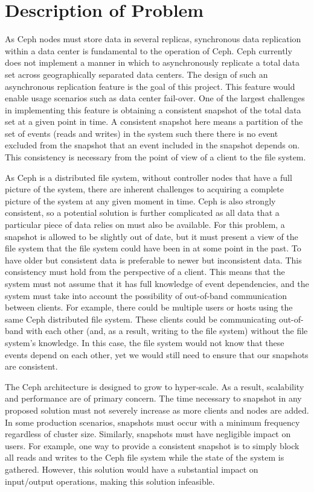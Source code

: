 \chapter{Description of Problem}
\label{sec:description}

As Ceph nodes must store data in several replicas, synchronous data
replication within a data center is fundamental to the operation of
Ceph. Ceph currently does not implement a manner in which to
asynchronously replicate a total data set across geographically
separated data centers. The design of such an asynchronous replication
feature is the goal of this project.  This feature would enable usage
scenarios such as data center fail-over. One of the largest challenges
in implementing this feature is obtaining a consistent snapshot of the
total data set at a given point in time. A consistent snapshot here
means a partition of the set of events (reads and writes) in the
system such there there is no event excluded from the snapshot that an
event included in the snapshot depends on. This consistency is
necessary from the point of view of a client to the file system.

As Ceph is a distributed file system, without controller nodes that
have a full picture of the system, there are inherent challenges to
acquiring a complete picture of the system at any given moment in
time. Ceph is also strongly consistent, so a potential solution is
further complicated as all data that a particular piece of data relies
on must also be available. For this problem, a snapshot is allowed to
be slightly out of date, but it must present a view of the file system
that the file system could have been in at some point in the past. To
have older but consistent data is preferable to newer but inconsistent
data. This consistency must hold from the perspective of a
client. This means that the system must not assume that it has full
knowledge of event dependencies, and the system must take into account
the possibility of out-of-band communication between clients. For
example, there could be multiple users or hosts using the same Ceph
distributed file system. These clients could be communicating
out-of-band with each other (and, as a result, writing to the file
system) without the file system’s knowledge. In this case, the file
system would not know that these events depend on each other, yet we
would still need to ensure that our snapshots are consistent.

The Ceph architecture is designed to grow to hyper-scale. As a result,
scalability and performance are of primary concern. The time necessary
to snapshot in any proposed solution must not severely increase as
more clients and nodes are added. In some production scenarios,
snapshots must occur with a minimum frequency regardless of cluster
size. Similarly, snapshots must have negligible impact on users. For
example, one way to provide a consistent snapshot is to simply block
all reads and writes to the Ceph file system while the state of the
system is gathered. However, this solution would have a substantial
impact on input/output operations, making this solution infeasible.

